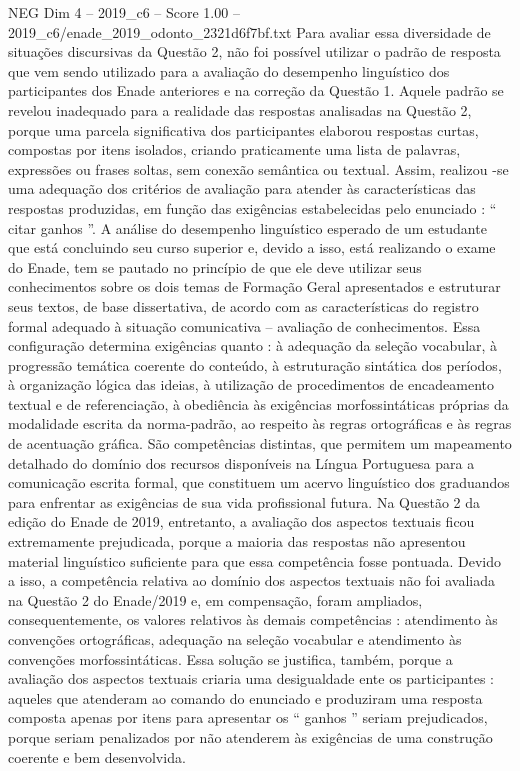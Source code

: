\begin{textsample}{NEG Dim 4 – 2019\_c6 – Score 1.00 – 2019\_c6/enade\_2019\_odonto\_2321d6f7bf.txt}
Para avaliar essa diversidade de situações discursivas da Questão 2, não foi possível utilizar o padrão de resposta que vem sendo utilizado para a avaliação do desempenho linguístico dos participantes dos Enade anteriores e na correção da Questão 1.
Aquele padrão se revelou inadequado para a realidade das respostas analisadas na Questão 2, porque uma parcela significativa dos participantes elaborou respostas curtas, compostas por itens isolados, criando praticamente uma lista de palavras, expressões ou frases soltas, sem conexão semântica ou textual.
Assim, realizou -se uma adequação dos critérios de avaliação para atender às características das respostas produzidas, em função das exigências estabelecidas pelo enunciado : “ citar ganhos ”.
A análise do desempenho linguístico esperado de um estudante que está concluindo seu curso superior e, devido a isso, está realizando o exame do Enade, tem se pautado no princípio de que ele deve utilizar seus conhecimentos sobre os dois temas de Formação Geral apresentados e estruturar seus textos, de base dissertativa, de acordo com as características do registro formal adequado à situação comunicativa – avaliação de conhecimentos.
Essa configuração determina exigências quanto : à adequação da seleção vocabular, à progressão temática coerente do conteúdo, à estruturação sintática dos períodos, à organização lógica das ideias, à utilização de procedimentos de encadeamento textual e de referenciação, à obediência às exigências morfossintáticas próprias da modalidade escrita da norma-padrão, ao respeito às regras ortográficas e às regras de acentuação gráfica.
São competências distintas, que permitem um mapeamento detalhado do domínio dos recursos disponíveis na Língua Portuguesa para a comunicação escrita formal, que constituem um acervo linguístico dos graduandos para enfrentar as exigências de sua vida profissional futura.
Na Questão 2 da edição do Enade de 2019, entretanto, a avaliação dos aspectos textuais ficou extremamente prejudicada, porque a maioria das respostas não apresentou material linguístico suficiente para que essa competência fosse pontuada.
Devido a isso, a competência relativa ao domínio dos aspectos textuais não foi avaliada na Questão 2 do Enade/2019 e, em compensação, foram ampliados, consequentemente, os valores relativos às demais competências : atendimento às convenções ortográficas, adequação na seleção vocabular e atendimento às convenções morfossintáticas.
Essa solução se justifica, também, porque a avaliação dos aspectos textuais criaria uma desigualdade ente os participantes : aqueles que atenderam ao comando do enunciado e produziram uma resposta composta apenas por itens para apresentar os “ ganhos ” seriam prejudicados, porque seriam penalizados por não atenderem às exigências de uma construção coerente e bem desenvolvida.

\end{textsample}

